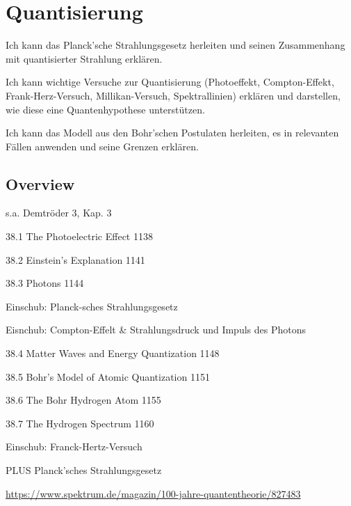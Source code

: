 \renewcommand{\lastmod}{10. September 2024}
\renewcommand{\chapterauthors}{Markus Lippitz}

\chapter{Quantisierung}




Ich kann das Planck’sche Strahlungsgesetz herleiten und seinen Zusammenhang mit quantisierter Strahlung erklären. 

Ich kann wichtige Versuche zur Quantisierung (Photoeffekt, Compton-Effekt, Frank-Herz-Versuch, Millikan-Versuch, Spektrallinien) erklären und darstellen, wie diese eine Quantenhypothese unterstützen. 

Ich kann das Modell aus den Bohr’schen Postulaten herleiten, es in relevanten Fällen anwenden und seine Grenzen erklären.

\section{Overview}

s.a. Demtröder 3, Kap. 3


38.1 The Photoelectric Effect 1138


38.2 Einstein's Explanation 1141

38.3 Photons 1144


Einschub: Planck-sches Strahlungsgesetz

Eisnchub: Compton-Effelt \& Strahlungsdruck und Impuls des Photons  




38.4 Matter Waves and Energy Quantization 1148

38.5 Bohr's Model of Atomic Quantization 1151

38.6 The Bohr Hydrogen Atom 1155

38.7 The Hydrogen Spectrum 1160

Einschub: Franck-Hertz-Versuch


PLUS Planck’sches Strahlungsgesetz


\url{https://www.spektrum.de/magazin/100-jahre-quantentheorie/827483}

